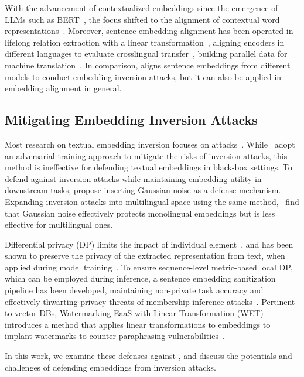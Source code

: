 With the advancement of contextualized embeddings since the emergence of LLMs such as BERT~\citep{devlin2018bert}, the focus shifted to the alignment of contextual word representations~\citep{schuster-etal-2019-cross, aldarmaki-diab-2019-context,wang-etal-2019-cross,alqahtani-etal-2021-using-optimal,cao2020multilingualalignmentcontextualword, jalili-sabet-etal-2020-simalign}.
Moreover, sentence embedding alignment has been operated in lifelong relation extraction with a linear transformation~\citep{wang-etal-2019-sentence}, aligning encoders in different languages to evaluate crosslingual transfer~\citep{conneau2018xnlievaluatingcrosslingualsentence},  building parallel data for machine translation~\citep{krahn2023sentenceembeddingmodelsancient}. 
In comparison, \textbf{\ourmethod} aligns sentence embeddings from different models to conduct embedding inversion attacks, but it can also be applied in embedding alignment in general. 


\subsection{Mitigating Embedding Inversion Attacks}
Most research on textual embedding inversion focuses on attacks~\cite {li-etal-2023-sentence, huang_transferable_2024,chen2024typ}.
While~\citet{10.1145/3372297.3417270} adopt an adversarial training approach to mitigate the risks of inversion attacks, this method is ineffective for defending textual embeddings in black-box settings.
To defend against inversion attacks while maintaining embedding utility in downstream tasks, \citet{morris2023text} propose inserting Gaussian noise as a defense mechanism.
Expanding inversion attacks into multilingual space using the same method,~\citet{chen2024text} find that Gaussian noise effectively protects monolingual embeddings but is less effective for multilingual ones.

Differential privacy (DP) limits the impact of individual element~\citep{dwork2014algorithmic}, and has been shown to preserve the privacy of the extracted representation from text, when applied during model training~\citep{lyu-etal-2020-differentially}.
To ensure sequence-level metric-based local DP, which can be employed during inference, a sentence embedding sanitization pipeline has been developed, maintaining non-private task accuracy and effectively thwarting privacy threats of membership inference attacks~\citep{du2023sanitizing}.
Pertinent to vector DBs, Watermarking EaaS with Linear Transformation (WET) introduces a method that applies linear transformations to embeddings to implant watermarks to counter paraphrasing vulnerabilities~\citep{shetty2024wet}.

In this work, we examine these defenses against \textbf{\ourmethod}, and discuss the potentials and challenges of defending embeddings from inversion attacks.